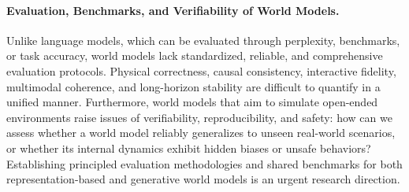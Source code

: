 \paragraph{Evaluation, Benchmarks, and Verifiability of World Models.}
Unlike language models, which can be evaluated through perplexity, benchmarks, or task accuracy, world models lack standardized, reliable, and comprehensive evaluation protocols.
Physical correctness, causal consistency, interactive fidelity, multimodal coherence, and long-horizon stability are difficult to quantify in a unified manner.
Furthermore, world models that aim to simulate open-ended environments raise issues of verifiability, reproducibility, and safety: how can we assess whether a world model reliably generalizes to unseen real-world scenarios, or whether its internal dynamics exhibit hidden biases or unsafe behaviors?
Establishing principled evaluation methodologies and shared benchmarks for both representation-based and generative world models is an urgent research direction.
